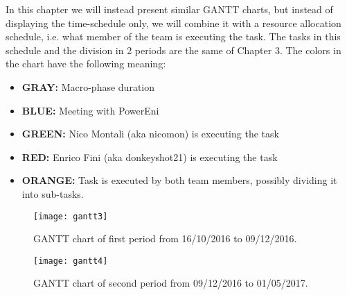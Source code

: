 In this chapter we will instead present similar GANTT charts, but instead of displaying the time-schedule only, we will combine it with a resource allocation schedule, i.e. what member of the team is executing the task. The tasks in this schedule and the division in 2 periods are the same of Chapter 3. 
\bigbreak
The colors in the chart have the following meaning: 
\begin{itemize}
\item \textbf{GRAY: } Macro-phase duration 
\item \textbf{BLUE: } Meeting with PowerEni
\item \textbf{GREEN: } Nico Montali (aka nicomon) is executing the task 
\item \textbf{RED: } Enrico Fini (aka donkeyshot21) is executing the task
\item \textbf{ORANGE: } Task is executed by both team members, possibly dividing it into sub-tasks.
\end{itemize}

\begin{figure}
  \centering
  \texttt{[image: gantt3]}
  \caption{GANTT chart of first period from 16/10/2016 to 09/12/2016.}
\end{figure}

\begin{figure}
  \centering
  \texttt{[image: gantt4]}
  \caption{GANTT chart of second period from 09/12/2016 to 01/05/2017.}
\end{figure}